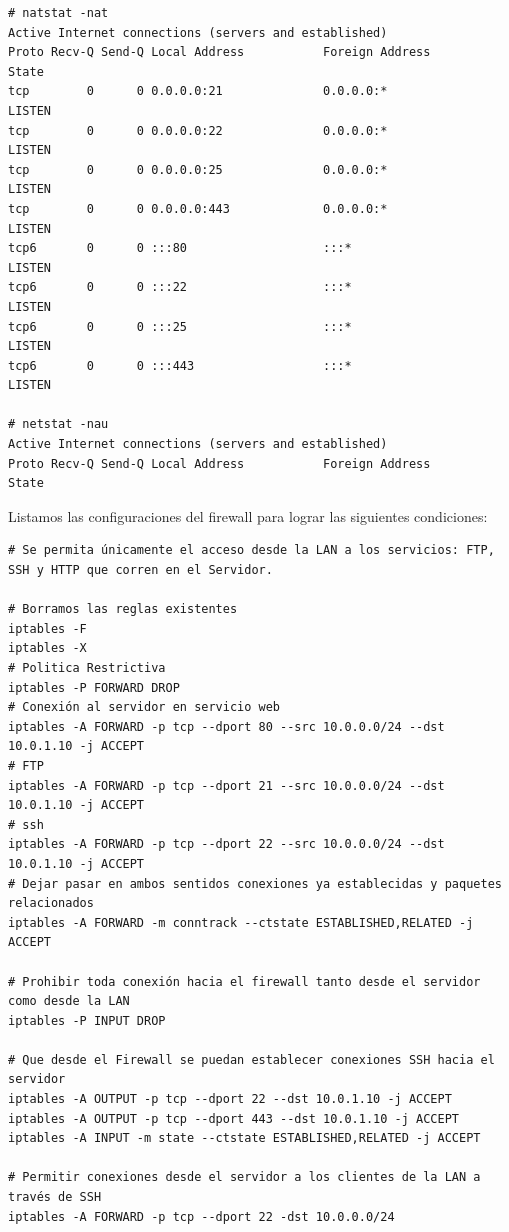 \begingroup
    \fontsize{9pt}{10pt}\selectfont
\begin{lstlisting}
# natstat -nat
Active Internet connections (servers and established)
Proto Recv-Q Send-Q Local Address           Foreign Address         State      
tcp        0      0 0.0.0.0:21              0.0.0.0:*               LISTEN     
tcp        0      0 0.0.0.0:22              0.0.0.0:*               LISTEN     
tcp        0      0 0.0.0.0:25              0.0.0.0:*               LISTEN     
tcp        0      0 0.0.0.0:443             0.0.0.0:*               LISTEN     
tcp6       0      0 :::80                   :::*                    LISTEN     
tcp6       0      0 :::22                   :::*                    LISTEN     
tcp6       0      0 :::25                   :::*                    LISTEN     
tcp6       0      0 :::443                  :::*                    LISTEN 

# netstat -nau
Active Internet connections (servers and established)
Proto Recv-Q Send-Q Local Address           Foreign Address         State   
\end{lstlisting}
\endgroup

Listamos las configuraciones del firewall para lograr las siguientes condiciones:

\begingroup
    \fontsize{9pt}{10pt}\selectfont
\begin{lstlisting}
# Se permita únicamente el acceso desde la LAN a los servicios: FTP, SSH y HTTP que corren en el Servidor.

# Borramos las reglas existentes
iptables -F
iptables -X
# Politica Restrictiva
iptables -P FORWARD DROP
# Conexión al servidor en servicio web
iptables -A FORWARD -p tcp --dport 80 --src 10.0.0.0/24 --dst 10.0.1.10 -j ACCEPT
# FTP
iptables -A FORWARD -p tcp --dport 21 --src 10.0.0.0/24 --dst 10.0.1.10 -j ACCEPT
# ssh
iptables -A FORWARD -p tcp --dport 22 --src 10.0.0.0/24 --dst 10.0.1.10 -j ACCEPT
# Dejar pasar en ambos sentidos conexiones ya establecidas y paquetes relacionados
iptables -A FORWARD -m conntrack --ctstate ESTABLISHED,RELATED -j ACCEPT

# Prohibir toda conexión hacia el firewall tanto desde el servidor como desde la LAN
iptables -P INPUT DROP  

# Que desde el Firewall se puedan establecer conexiones SSH hacia el servidor
iptables -A OUTPUT -p tcp --dport 22 --dst 10.0.1.10 -j ACCEPT
iptables -A OUTPUT -p tcp --dport 443 --dst 10.0.1.10 -j ACCEPT
iptables -A INPUT -m state --ctstate ESTABLISHED,RELATED -j ACCEPT

# Permitir conexiones desde el servidor a los clientes de la LAN a través de SSH
iptables -A FORWARD -p tcp --dport 22 -dst 10.0.0.0/24
\end{lstlisting}
\endgroup

